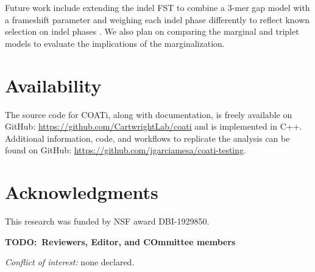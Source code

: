 \documentclass[12pt,letterpaper]{article}
\newcommand{\TODO}[1]{\begingroup\bfseries\color{red}TODO:~#1\endgroup}
\begin{document}
Future work include extending the indel FST to combine a 3-mer gap model with a frameshift parameter and weighing each indel phase differently to reflect known selection on indel phases \citep{zhu2022profiling}.
We also plan on comparing the marginal and triplet models to evaluate the implications of the marginalization.


\section*{Availability}
The source code for COATi, along with documentation, is freely available on GitHub: \url{https://github.com/CartwrightLab/coati} and is implemented in C++. Additional information, code, and workflows to replicate the analysis can be found on GitHub: \url{https://github.com/jgarciamesa/coati-testing}.


\section*{Acknowledgments}

This research was funded by NSF award DBI-1929850.

\TODO{Reviewers, Editor, and COmmittee members}

\noindent \textit{Conflict of interest:} none declared.

%
\setlength{\bibhang}{0pt}


\nolinenumbers
\end{document}
